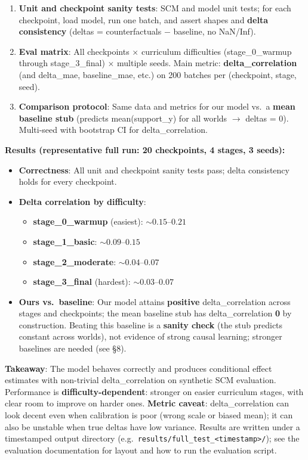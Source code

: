 \documentclass[12pt]{article}
\begin{document}
\begin{enumerate}
    \item \textbf{Unit and checkpoint sanity tests}: SCM and model unit tests; for each checkpoint, load model, run one batch, and assert shapes and \textbf{delta consistency} (deltas = counterfactuals $-$ baseline, no NaN/Inf).
    \item \textbf{Eval matrix}: All checkpoints $\times$ curriculum difficulties (stage\_0\_warmup through stage\_3\_final) $\times$ multiple seeds. Main metric: \textbf{delta\_correlation} (and delta\_mae, baseline\_mae, etc.) on 200 batches per (checkpoint, stage, seed).
    \item \textbf{Comparison protocol}: Same data and metrics for our model vs.\ a \textbf{mean baseline stub} (predicts mean(support\_y) for all worlds $\to$ deltas = 0). Multi-seed with bootstrap CI for delta\_correlation.
\end{enumerate}

\textbf{Results (representative full run: 20 checkpoints, 4 stages, 3 seeds):}

\begin{itemize}
    \item \textbf{Correctness}: All unit and checkpoint sanity tests pass; delta consistency holds for every checkpoint.
    \item \textbf{Delta correlation by difficulty}:
    \begin{itemize}
        \item \textbf{stage\_0\_warmup} (easiest): $\sim 0.15$--$0.21$
        \item \textbf{stage\_1\_basic}: $\sim 0.09$--$0.15$
        \item \textbf{stage\_2\_moderate}: $\sim 0.04$--$0.07$
        \item \textbf{stage\_3\_final} (hardest): $\sim 0.03$--$0.07$
    \end{itemize}
    \item \textbf{Ours vs.\ baseline}: Our model attains \textbf{positive} delta\_correlation across stages and checkpoints; the mean baseline stub has delta\_correlation \textbf{0} by construction. Beating this baseline is a \textbf{sanity check} (the stub predicts constant across worlds), not evidence of strong causal learning; stronger baselines are needed (see \S8).
\end{itemize}

\textbf{Takeaway}: The model behaves correctly and produces conditional effect estimates with non-trivial delta\_correlation on synthetic SCM evaluation. Performance is \textbf{difficulty-dependent}: stronger on easier curriculum stages, with clear room to improve on harder ones. \textbf{Metric caveat}: delta\_correlation can look decent even when calibration is poor (wrong scale or biased mean); it can also be unstable when true deltas have low variance. Results are written under a timestamped output directory (e.g.\ \texttt{results/full\_test\_<timestamp>/}); see the evaluation documentation for layout and how to run the evaluation script.
\end{document}
